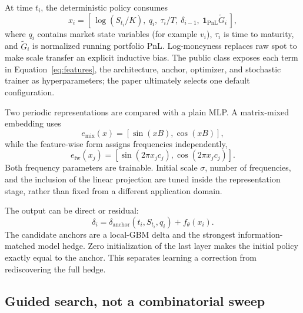 \documentclass[sigconf,balance=false]{acmart}
\begin{document}
At time $t_i$, the deterministic policy consumes
\begin{equation}
 x_i =
 [\,\log(S_{t_i}/K),\ q_i,\ \tau_i/T,\ \delta_{i-1},\
 \mathbf{1}_{\mathrm{PnL}}\widetilde{G}_i\,],
 \label{eq:features}
\end{equation}
where $q_i$ contains market state variables (for example $v_i$), $\tau_i$ is
time to maturity, and $\widetilde{G}_i$ is normalized running portfolio PnL.
Log-moneyness replaces raw spot to make scale transfer an explicit inductive
bias.  The public class exposes each term in Equation~\eqref{eq:features}, the
architecture, anchor, optimizer, and stochastic trainer as hyperparameters;
the paper ultimately selects one default configuration.

Two periodic representations are compared with a plain MLP.  A matrix-mixed
embedding uses
\[
 e_{\mathrm{mix}}(x)=[\sin(xB),\cos(xB)],
\]
while the feature-wise form assigns frequencies independently,
\[
 e_{\mathrm{fw}}(x_j)=
 [\sin(2\pi x_j c_j),\cos(2\pi x_j c_j)].
\]
Both frequency parameters are trainable.  Initial scale $\sigma$, number of
frequencies, and the inclusion of the linear projection are tuned inside the
representation stage, rather than fixed from a different application domain.

The output can be direct or residual:
\begin{equation}
 \delta_i = \delta_{\mathrm{anchor}}(t_i,S_{t_i},q_i)
            + f_\theta(x_i).
 \label{eq:residual}
\end{equation}
The candidate anchors are a local-GBM delta and the strongest
information-matched model hedge.  Zero initialization of the last layer makes
the initial policy exactly equal to the anchor.  This separates learning a
correction from rediscovering the full hedge.

\subsection{Guided search, not a combinatorial sweep}
\end{document}
